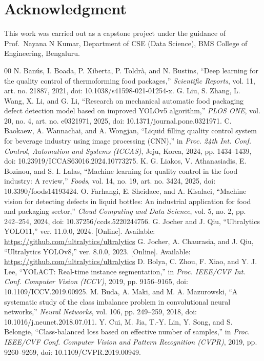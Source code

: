 \documentclass[conference]{IEEEtran}
\begin{document}
\section*{Acknowledgment}
This work was carried out as a capstone project under the guidance of Prof.\ Nayana N Kumar, Department of CSE (Data Science), BMS College of Engineering, Bengaluru.

\begin{thebibliography}{00}
 N. Banús, I. Boada, P. Xiberta, P. Toldrà, and N. Bustins, ``Deep learning for the quality control of thermoforming food packages,'' \textit{Scientific Reports}, vol. 11, art. no. 21887, 2021, doi: 10.1038/s41598-021-01254-x.
 G. Liu, S. Zhang, L. Wang, X. Li, and G. Li, ``Research on mechanical automatic food packaging defect detection model based on improved YOLOv5 algorithm,'' \textit{PLOS ONE}, vol. 20, no. 4, art. no. e0321971, 2025, doi: 10.1371/journal.pone.0321971.
 C. Baokaew, A. Wannachai, and A. Wongjan, ``Liquid filling quality control system for beverage industry using image processing (CNN),'' in \textit{Proc. 24th Int. Conf. Control, Automation and Systems (ICCAS)}, Jeju, Korea, 2024, pp. 1434--1439, doi: 10.23919/ICCAS63016.2024.10773275.
 K. G. Liakos, V. Athanasiadis, E. Bozinou, and S. I. Lalas, ``Machine learning for quality control in the food industry: A review,'' \textit{Foods}, vol. 14, no. 19, art. no. 3424, 2025, doi: 10.3390/foods14193424.
 O. Farhangi, E. Sheidaee, and A. Kisalaei, ``Machine vision for detecting defects in liquid bottles: An industrial application for food and packaging sector,'' \textit{Cloud Computing and Data Science}, vol. 5, no. 2, pp. 242--254, 2024, doi: 10.37256/ccds.5220244756.
 G. Jocher and J. Qiu, ``Ultralytics YOLO11,'' ver. 11.0.0, 2024. [Online]. Available: \url{https://github.com/ultralytics/ultralytics}
 G. Jocher, A. Chaurasia, and J. Qiu, ``Ultralytics YOLOv8,'' ver. 8.0.0, 2023. [Online]. Available: \url{https://github.com/ultralytics/ultralytics}
 D. Bolya, C. Zhou, F. Xiao, and Y. J. Lee, ``YOLACT: Real-time instance segmentation,'' in \textit{Proc. IEEE/CVF Int. Conf. Computer Vision (ICCV)}, 2019, pp. 9156--9165, doi: 10.1109/ICCV.2019.00925.
 M. Buda, A. Maki, and M. A. Mazurowski, ``A systematic study of the class imbalance problem in convolutional neural networks,'' \textit{Neural Networks}, vol. 106, pp. 249--259, 2018, doi: 10.1016/j.neunet.2018.07.011.
 Y. Cui, M. Jia, T.-Y. Lin, Y. Song, and S. Belongie, ``Class-balanced loss based on effective number of samples,'' in \textit{Proc. IEEE/CVF Conf. Computer Vision and Pattern Recognition (CVPR)}, 2019, pp. 9260--9269, doi: 10.1109/CVPR.2019.00949.

\end{thebibliography}
\end{document}
